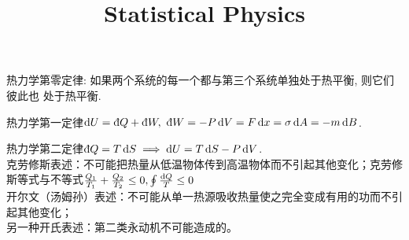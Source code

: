 \documentclass[UTF8,9pt]{ctexart}
\title{Statistical Physics}
\newcommand{\q}[1]{{\color{red} #1}}
\begin{document}
\maketitle
{}
\q{热力学第零定律}: 如果两个系统的每一个都与第三个系统单独处于热平衡, 则它们彼此也
处于热平衡.

\q{热力学第一定律}$\d U=\dbar Q+\dbar W,\ \dbar W=-P\d V=F\d x=\sg \d A = -m\d B$.

\q{热力学第二定律}$\dbar Q = T\d S \ip \d U = T\d S -P\d V$. \\
克劳修斯表述：不可能把热量从低温物体传到高温物体而不引起其他变化；克劳修斯等式与不等式$\frac{Q_{1}}{T_{1}}+\frac{Q_{2}}{T_{2}} \leq 0,\oint \frac{\mathop{}\!\mathrm{d} Q}{T}\leq 0$\\
开尔文（汤姆孙）表述：不可能从单一热源吸收热量使之完全变成有用的功而不引起其他变化；\\
另一种开氏表述：第二类永动机不可能造成的。
\end{document}
